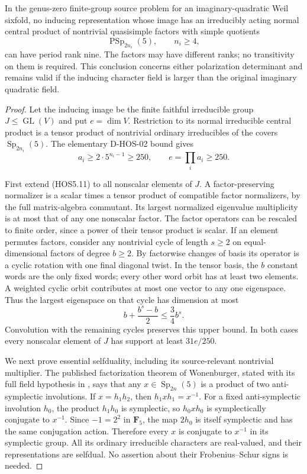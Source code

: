 \begin{theorem}
\label{D-HOS-10}
In the genus-zero finite-group source problem for an imaginary-quadratic
Weil sixfold, no inducing representation whose image has an
irreducibly acting normal central product of nontrivial quasisimple
factors with simple quotients
\[
               \operatorname{PSp}_{2n_i}(5),\qquad n_i\ge4,
                                                               \tag{HOS5.21}
\]
can have period rank nine. The factors may have different ranks;
no transitivity on them is required. This conclusion concerns either
polarization determinant and remains valid if the inducing character
field is larger than the original imaginary quadratic field.
\end{theorem}

\begin{proof}
Let the inducing image be the finite faithful irreducible group
$J\le\operatorname{GL}(V)$ and put $e=\dim V$.
Restriction to its normal irreducible central product is a tensor
product of nontrivial ordinary irreducibles of the covers
$\operatorname{Sp}_{2n_i}(5)$. The elementary D-HOS-02 bound gives
\[
                   a_i\ge2\cdot5^{n_i-1}\ge250,
                      \qquad e=\prod_i a_i\ge250.           \tag{HOS5.22}
\]

First extend (HOS5.11) to all nonscalar elements of $J$. A
factor-preserving normalizer is a scalar times a tensor product
of compatible factor normalizers, by the full matrix-algebra
commutant. Its largest normalized eigenvalue multiplicity is at
most that of any one nonscalar factor. The factor operators can
be rescaled to finite order, since a power of their tensor
product is scalar. If an element permutes factors, consider any
nontrivial cycle of length $s\ge2$ on equal-dimensional factors
of degree $b\ge2$. By factorwise changes of basis its operator
is a cyclic rotation with one final diagonal twist. In the
tensor basis, the $b$ constant words are the only fixed words;
every other word orbit has at least two elements. A weighted
cyclic orbit contributes at most one vector to any one eigenspace.
Thus the largest eigenspace on that cycle has dimension at most
\[
                 b+\frac{b^s-b}{2}\le\frac34 b^s.
\]
Convolution with the remaining cycles preserves this upper bound.
In both cases every nonscalar element of $J$ has support at least
$31e/250$.

We next prove essential selfduality, including its source-relevant
nontrivial multiplier. The published factorization theorem of
Wonenburger, stated with its full field hypothesis in
\cite[Theorem~1, author p.~1]{HOS:Vinroot2004}, says that any
$x\in\operatorname{Sp}_{2n}(5)$ is a product of two
anti-symplectic involutions. If $x=h_1h_2$, then
$h_1xh_1=x^{-1}$. For a fixed anti-symplectic involution $h_0$,
the product $h_1h_0$ is symplectic, so $h_0xh_0$ is
symplectically conjugate to $x^{-1}$. Since $-1=2^2$ in
$\mathbf F_5$, the map $2h_0$ is itself symplectic and has the
same conjugation action. Therefore every $x$ is conjugate to
$x^{-1}$ in its symplectic group. All its ordinary irreducible
characters are real-valued, and their representations are
selfdual. No assertion about their Frobenius--Schur signs is needed.


\end{proof}
